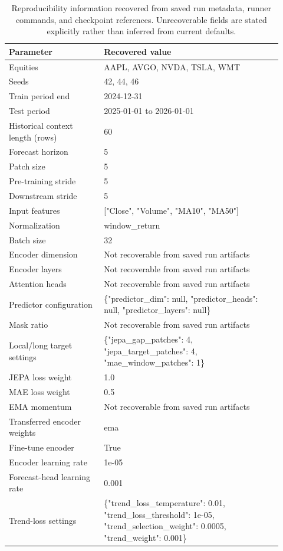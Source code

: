 \begin{table}[p]
\centering
\small
\caption{Reproducibility information recovered from saved run metadata, runner commands, and checkpoint references. Unrecoverable fields are stated explicitly rather than inferred from current defaults.}
\label{tab:reproducibility}
\begin{tabular}{p{0.32\linewidth}p{0.60\linewidth}}
\toprule
Parameter & Recovered value \\
\midrule
Equities & AAPL, AVGO, NVDA, TSLA, WMT \\
Seeds & 42, 44, 46 \\
Train period end & 2024-12-31 \\
Test period & 2025-01-01 to 2026-01-01 \\
Historical context length (rows) & 60 \\
Forecast horizon & 5 \\
Patch size & 5 \\
Pre-training stride & 5 \\
Downstream stride & 5 \\
Input features & ["Close", "Volume", "MA10", "MA50"] \\
Normalization & window\_return \\
Batch size & 32 \\
Encoder dimension & Not recoverable from saved run artifacts \\
Encoder layers & Not recoverable from saved run artifacts \\
Attention heads & Not recoverable from saved run artifacts \\
Predictor configuration & \{"predictor\_dim": null, "predictor\_heads": null, "predictor\_layers": null\} \\
Mask ratio & Not recoverable from saved run artifacts \\
Local/long target settings & \{"jepa\_gap\_patches": 4, "jepa\_target\_patches": 4, "mae\_window\_patches": 1\} \\
JEPA loss weight & 1.0 \\
MAE loss weight & 0.5 \\
EMA momentum & Not recoverable from saved run artifacts \\
Transferred encoder weights & ema \\
Fine-tune encoder & True \\
Encoder learning rate & 1e-05 \\
Forecast-head learning rate & 0.001 \\
Trend-loss settings & \{"trend\_loss\_temperature": 0.01, "trend\_loss\_threshold": 1e-05, "trend\_selection\_weight": 0.0005, "trend\_weight": 0.001\} \\

\end{tabular}
\end{table}
